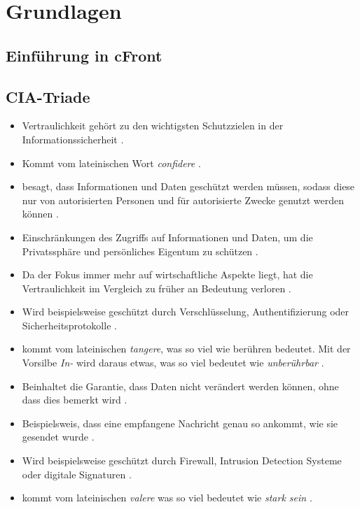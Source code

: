 \chapter{Grundlagen}

\section{Einführung in cFront}

\section{CIA-Triade}
\begin{itemize}
    \item Vertraulichkeit gehört zu den wichtigsten Schutzzielen in der Informationssicherheit \cite{samonas2014cia}.
    \item Kommt vom lateinischen Wort \textit{confidere} \cite{samonas2014cia}.
    \item besagt, dass Informationen und Daten geschützt werden müssen, sodass diese nur von autorisierten Personen und für autorisierte Zwecke genutzt werden können \cite{samonas2014cia}.
    \item Einschränkungen des Zugriffs auf Informationen und Daten, um die Privatssphäre und persönliches Eigentum zu schützen \cite{samonas2014cia}.
    \item Da der Fokus immer mehr auf wirtschaftliche Aspekte liegt, hat die Vertraulichkeit im Vergleich zu früher an Bedeutung verloren \cite{samonas2014cia}.
    \item Wird beispielsweise geschützt durch Verschlüsselung, Authentifizierung oder Sicherheitsprotokolle \cite{agarwal2011security}.
    \item kommt vom lateinischen \textit{tangere}, was so viel wie berühren bedeutet. Mit der Vorsilbe \textit{In-} wird daraus etwas, was so viel bedeutet wie \textit{unberührbar} \cite{samonas2014cia}.
    \item Beinhaltet die Garantie, dass Daten nicht verändert werden können, ohne dass dies bemerkt wird \cite{agarwal2011security}.
    \item Beispielsweis, dass eine empfangene Nachricht genau so ankommt, wie sie gesendet wurde \cite{agarwal2011security}.
    \item Wird beispielsweise geschützt durch Firewall, Intrusion Detection Systeme oder digitale Signaturen \cite{agarwal2011security}.
    \item kommt vom lateinischen \textit{valere} was so viel bedeutet wie \textit{stark sein} \cite{samonas2014cia}.

\end{itemize}
